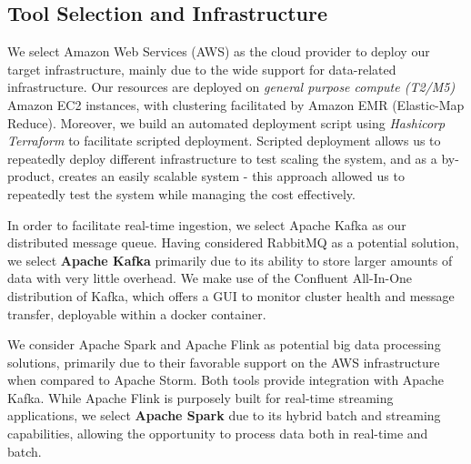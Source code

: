 \documentclass[10pt,journal,final,a4paper]{IEEEtran}
\begin{document}
\subsection{Tool Selection and Infrastructure}
We select Amazon Web Services (AWS) as the cloud provider to deploy our target infrastructure, mainly due to the wide support for data-related infrastructure. Our resources are deployed on \textit{general purpose compute (T2/M5) }Amazon EC2 instances, with clustering facilitated by Amazon EMR (Elastic-Map Reduce). Moreover, we build an automated deployment script using \textit{Hashicorp Terraform} to facilitate scripted deployment. Scripted deployment allows us to repeatedly deploy different infrastructure to test scaling the system, and as a by-product, creates an easily scalable system - this approach allowed us to repeatedly test the system while managing the cost effectively.

In order to facilitate real-time ingestion, we select Apache Kafka\cite{kafka} as our distributed message queue. Having considered RabbitMQ as a potential solution, we select \textbf{Apache Kafka} primarily due to its ability to store larger amounts of data with very little overhead. We make use of the Confluent All-In-One distribution of Kafka, which offers a GUI to monitor cluster health and message transfer, deployable within a docker container.

We consider Apache Spark\cite{spark} and Apache Flink\cite{flink} as potential big data processing solutions, primarily due to their favorable support on the AWS infrastructure when compared to Apache Storm. Both tools provide integration with Apache Kafka. While Apache Flink is purposely built for real-time streaming applications, we select \textbf{Apache Spark} due to its hybrid batch and streaming capabilities, allowing the opportunity to process data both in real-time and batch. 
\end{document}
